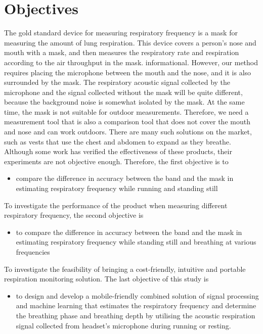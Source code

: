 \section{Objectives}
The gold standard device for measuring respiratory frequency is a mask for measuring the amount of lung respiration. This device covers a person's nose and mouth with a mask, and then measures the respiratory rate and respiration according to the air throughput in the mask. informational. However, our method requires placing the microphone between the mouth and the nose, and it is also surrounded by the mask. The respiratory acoustic signal collected by the microphone and the signal collected without the mask will be quite different, because the background noise is somewhat isolated by the mask. At the same time, the mask is not suitable for outdoor measurements. Therefore, we need a measurement tool that is also a comparison tool that does not cover the mouth and nose and can work outdoors. There are many such solutions on the market, such as vests that use the chest and abdomen to expand as they breathe. Although some work has verified the effectiveness of these products, their experiments are not objective enough. Therefore, the first objective is to 
\begin{itemize}
\item compare the difference in accuracy between the band and the mask in estimating respiratory frequency while running and standing still
\end{itemize}

To investigate the performance of the product when measuring different respiratory frequency, the second objective is 
\begin{itemize}
\item to compare the difference in accuracy between the band and the mask in estimating respiratory frequency while standing still and breathing at various frequencies
\end{itemize}

To investigate the feasibility of bringing a cost-friendly, intuitive and portable respiration monitoring solution. The last objective of this study is
\begin{itemize}
\item to design and develop a mobile-friendly combined solution of signal processing and machine learning that estimates the respiratory frequency and determine the breathing phase and breathing depth by utilising the acoustic respiration signal collected from headset’s microphone during running or resting.
\end{itemize}
